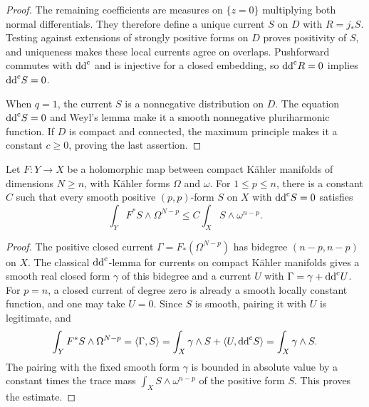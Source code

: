 \begin{proof}
The remaining coefficients are measures on $\{z=0\}$ multiplying both normal differentials. They therefore define a unique current $S$ on $D$ with $R=j_*S$. Testing against extensions of strongly positive forms on $D$ proves positivity of $S$, and uniqueness makes these local currents agree on overlaps. Pushforward commutes with $\mathrm{dd}^{\mathrm{c}}$ and is injective for a closed embedding, so $\mathrm{dd}^{\mathrm{c}} R=0$ implies $\mathrm{dd}^{\mathrm{c}} S=0$.

When $q=1$, the current $S$ is a nonnegative distribution on $D$. The equation $\mathrm{dd}^{\mathrm{c}} S=0$ and Weyl's lemma make it a smooth nonnegative pluriharmonic function. If $D$ is compact and connected, the maximum principle makes it a constant $c\geq0$, proving the last assertion.
\end{proof}

\begin{lemma}\label{lem:smooth-pluriharmonic-pullback-mass}
Let $F\colon Y\to X$ be a holomorphic map between compact K\"ahler manifolds of dimensions $N\geq n$, with K\"ahler forms $\Omega$ and $\omega$. For $1\leq p\leq n$, there is a constant $C$ such that every smooth positive $(p,p)$-form $S$ on $X$ with $\mathrm{dd}^{\mathrm{c}} S=0$ satisfies
\[
 \int_Y F^*S\wedge\Omega^{N-p}
 \leq C\int_X S\wedge\omega^{n-p}.
\]
\end{lemma}
\begin{proof}
The positive closed current $\Gamma=F_*(\Omega^{N-p})$ has bidegree $(n-p,n-p)$ on $X$. The classical $\mathrm{dd}^{\mathrm{c}}$-lemma for currents on compact K\"ahler manifolds gives a smooth real closed form $\gamma$ of this bidegree and a current $U$ with $\Gamma=\gamma+\mathrm{dd}^{\mathrm{c}} U$. For $p=n$, a closed current of degree zero is already a smooth locally constant function, and one may take $U=0$. Since $S$ is smooth, pairing it with $U$ is legitimate, and
\[
 \int_Y F^*S\wedge\Omega^{N-p}
 =\langle\Gamma,S\rangle
 =\int_X\gamma\wedge S+\langle U,\mathrm{dd}^{\mathrm{c}} S\rangle
 =\int_X\gamma\wedge S.
\]
The pairing with the fixed smooth form $\gamma$ is bounded in absolute value by a constant times the trace mass $\int_XS\wedge\omega^{n-p}$ of the positive form $S$. This proves the estimate.
\end{proof}

